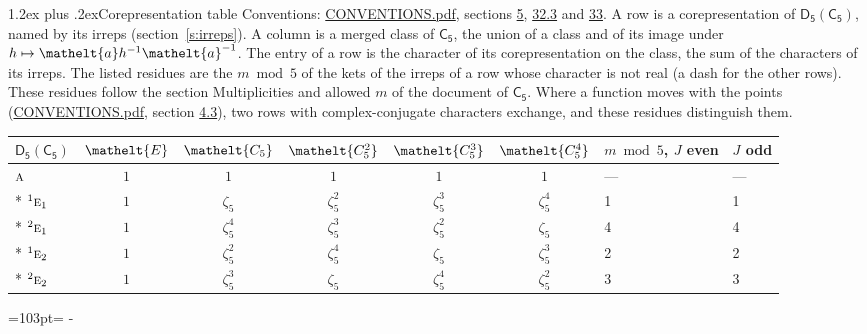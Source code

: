 \documentclass[10pt,a4paper]{article}
\makeatletter
\renewcommand\section{\@startsection{section}{1}{\z@}{-3ex plus -1ex minus -.2ex}%
  {1.2ex plus .2ex}{\normalfont\large\sffamily\bfseries\color{parttitle}}}
\newcommand{\needspace}[1]{\par\penalty-100\begingroup\dimen0=#1\relax\dimen2=\pagegoal
  \advance\dimen2-\pagetotal\ifdim\dimen0>\dimen2\relax\ifdim\dimen2>0pt\vfil\break\fi\fi
  \endgroup}
\numberwithin{equation}{section}
\newcommand{\eltfont}[1]{{\let\sigma\eltsigma\mathelt{#1}}}
\newcommand{\grp}[1]{\mathsf{#1}}
\newcommand{\irr}[1]{\text{\normalfont\scshape #1}}
\newcommand{\conjpair}[1]{{}^{#1}}
\newcommand{\cls}[1]{\eltfont{#1}}
\newcommand{\elt}[1]{\eltfont{#1}}
\newcommand{\rootunity}[1]{\zeta_{#1}}
\makeatother
\begin{document}
\section{Corepresentation table}\label{s:character_table}
Conventions: \href{../../CONVENTIONS.pdf}{CONVENTIONS.pdf}, sections \href{../../../rotation/CONVENTIONS.pdf\#conv.5}{5}, \href{../../CONVENTIONS.pdf\#conv.32.3}{32.3} and \href{../../CONVENTIONS.pdf\#conv.33}{33}.
A row is a corepresentation of $\grp{D_{5}}(\grp{C_{5}})$, named by its irreps (section~\ref{s:irreps}). A column is a merged class of $\grp{C_{5}}$, the union of a class and of its image under $h \mapsto \elt{a} h^{-1} \elt{a}^{-1}$. The entry of a row is the character of its corepresentation on the class, the sum of the characters of its irreps.
\leavevmode\label{n:head.parity}The listed residues are the $m \bmod 5$ of the kets of the irreps of a row whose character is not real (a dash for the other rows). These residues follow the section Multiplicities and allowed $m$ of the document of \href{../../../rotation/data/pdf/C5.pdf}{$\grp{C_{5}}$}. Where a function moves with the points (\href{../../CONVENTIONS.pdf}{CONVENTIONS.pdf}, section \href{../../../rotation/CONVENTIONS.pdf\#conv.4.3}{4.3}), two rows with complex-conjugate characters exchange, and these residues distinguish them.
{\small\setlength{\tabcolsep}{4pt}\begin{longtable}{@{}lcccccll@{}}\toprule
$\grp{D_{5}}(\grp{C_{5}})$ & $\cls{E}$ & $\cls{C_{5}}$ & $\cls{C_{5}^{2}}$ & $\cls{C_{5}^{3}}$ & $\cls{C_{5}^{4}}$ & $m \bmod 5$, $J$ even & $J$ odd\\\midrule\endhead
\bottomrule\endfoot\endlastfoot
$\irr{a}$ & $1$ & $1$ & $1$ & $1$ & $1$ & --- & ---\\*
$\conjpair{1}\irr{e}_{1}$ & $1$ & $\rootunity{5}$ & $\rootunity{5}^{2}$ & $\rootunity{5}^{3}$ & $\rootunity{5}^{4}$ & 1 & 1\\*
$\conjpair{2}\irr{e}_{1}$ & $1$ & $\rootunity{5}^{4}$ & $\rootunity{5}^{3}$ & $\rootunity{5}^{2}$ & $\rootunity{5}$ & 4 & 4\\*
$\conjpair{1}\irr{e}_{2}$ & $1$ & $\rootunity{5}^{2}$ & $\rootunity{5}^{4}$ & $\rootunity{5}$ & $\rootunity{5}^{3}$ & 2 & 2\\*
$\conjpair{2}\irr{e}_{2}$ & $1$ & $\rootunity{5}^{3}$ & $\rootunity{5}$ & $\rootunity{5}^{4}$ & $\rootunity{5}^{2}$ & 3 & 3\\
\bottomrule\end{longtable}}
\needspace{103pt}
\end{document}
